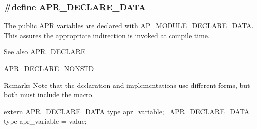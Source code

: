 \subsubsection[{\texorpdfstring{A\+P\+R\+\_\+\+D\+E\+C\+L\+A\+R\+E\+\_\+\+D\+A\+TA}{APR_DECLARE_DATA}}]{\setlength{\rightskip}{0pt plus 5cm}\#define A\+P\+R\+\_\+\+D\+E\+C\+L\+A\+R\+E\+\_\+\+D\+A\+TA}\hypertarget{group__apr__platform_ga16a1a3d65c57ce052fffb63190b1cadc}{}\label{group__apr__platform_ga16a1a3d65c57ce052fffb63190b1cadc}
The public A\+PR variables are declared with A\+P\+\_\+\+M\+O\+D\+U\+L\+E\+\_\+\+D\+E\+C\+L\+A\+R\+E\+\_\+\+D\+A\+TA. This assures the appropriate indirection is invoked at compile time. \begin{DoxySeeAlso}{See also}
\hyperlink{group__apr__platform_ga51bb2fd47cdff20cd9cb91d82e9b0efa}{A\+P\+R\+\_\+\+D\+E\+C\+L\+A\+RE} 

\hyperlink{group__apr__platform_gae3c44c6cd5ce0c984cd60de588506872}{A\+P\+R\+\_\+\+D\+E\+C\+L\+A\+R\+E\+\_\+\+N\+O\+N\+S\+TD} 
\end{DoxySeeAlso}
\begin{DoxyRemark}{Remarks}
Note that the declaration and implementations use different forms, but both must include the macro.
\end{DoxyRemark}

\begin{DoxyPre}\end{DoxyPre}



\begin{DoxyPre}extern APR\_DECLARE\_DATA type apr\_variable;~\newline
APR\_DECLARE\_DATA type apr\_variable = value;\end{DoxyPre}



\begin{DoxyPre}\end{DoxyPre}
